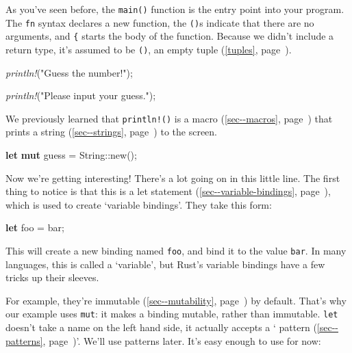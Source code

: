 \documentclass[a4paper,]{book}
\renewcommand*{\hyperref}[2][\ar]{%
  \def\ar{#2}%
  #2 (\autoref{#1}, page~\pageref{#1})}
\newenvironment{Shaded}{\begin{snugshade}}{\end{snugshade}}
\newcommand{\KeywordTok}[1]{\textcolor[rgb]{0.13,0.29,0.53}{\textbf{{#1}}}}
\newcommand{\DataTypeTok}[1]{\textcolor[rgb]{0.13,0.29,0.53}{{#1}}}
\newcommand{\StringTok}[1]{\textcolor[rgb]{0.31,0.60,0.02}{{#1}}}
\newcommand{\PreprocessorTok}[1]{\textcolor[rgb]{0.56,0.35,0.01}{\textit{{#1}}}}
\newcommand{\NormalTok}[1]{{#1}}
\begin{document}
As you've seen before, the \texttt{main()} function is the entry point
into your program. The \texttt{fn} syntax declares a new function, the
\texttt{()}s indicate that there are no arguments, and \texttt{\{}
starts the body of the function. Because we didn't include a return
type, it's assumed to be \texttt{()}, an empty \hyperref[tuples]{tuple}.

\begin{Shaded}
\begin{Highlighting}[]
    \PreprocessorTok{println!}\NormalTok{(}\StringTok{"Guess the number!"}\NormalTok{);}

    \PreprocessorTok{println!}\NormalTok{(}\StringTok{"Please input your guess."}\NormalTok{);}
\end{Highlighting}
\end{Shaded}

We previously learned that \texttt{println!()} is a
\hyperref[sec--macros]{macro} that prints a
\hyperref[sec--strings]{string} to the screen.

\begin{Shaded}
\begin{Highlighting}[]
    \KeywordTok{let} \KeywordTok{mut} \NormalTok{guess = }\DataTypeTok{String}\NormalTok{::new();}
\end{Highlighting}
\end{Shaded}

Now we're getting interesting! There's a lot going on in this little
line. The first thing to notice is that this is a
\hyperref[sec--variable-bindings]{let statement}, which is used to
create `variable bindings'. They take this form:

\begin{Shaded}
\begin{Highlighting}[]
\KeywordTok{let} \NormalTok{foo = bar;}
\end{Highlighting}
\end{Shaded}

This will create a new binding named \texttt{foo}, and bind it to the
value \texttt{bar}. In many languages, this is called a `variable', but
Rust's variable bindings have a few tricks up their sleeves.

For example, they're \hyperref[sec--mutability]{immutable} by default.
That's why our example uses \texttt{mut}: it makes a binding mutable,
rather than immutable. \texttt{let} doesn't take a name on the left hand
side, it actually accepts a `\hyperref[sec--patterns]{pattern}'. We'll
use patterns later. It's easy enough to use for now:
\end{document}
